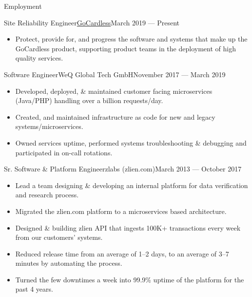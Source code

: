 \documentclass[]{mosabcv}
\begin{document}
\makeheader{}

\begin{cvsection}{Employment}
  \begin{cvsubsection}{Site Reliability
    Engineer}{\href{https://gocardless.com}{GoCardless}}{March 2019 ---
    Present}
    \begin{itemize}
      \item Protect, provide for, and progress the software and systems that
        make up the GoCardless product, supporting product teams in the
        deployment of high quality services.
    \end{itemize}
  \end{cvsubsection}

  \begin{cvsubsection}{Software Engineer}{WeQ Global Tech GmbH}{November 2017 ---
    March 2019}    \begin{itemize}
      \item Developed, deployed, \& maintained customer facing microservices
        (Java/PHP) handling over a billion requests/day.
      \item Created, and maintained infrastructure as code for new and legacy
        systems/microservices.
      \item Owned services uptime, performed systems troubleshooting \&
        debugging and participated in on-call rotations.
    \end{itemize}
  \end{cvsubsection}

  \begin{cvsubsection}{Sr. Software \& Platform Engineer}{zlabs
    (zlien.com)}{March 2013 --- October 2017}
    \begin{itemize}
      \item Lead a team designing \& developing an internal platform for data
        verification and research process.
      \item Migrated the zlien.com platform to a microservices based
        architecture.
      \item Designed \& building zlien API that ingests 100K+ transactions
        every week from our customers' systems.
      \item Reduced release time from an average of 1--2 days, to an average of
        3--7 minutes by automating the process.
      \item Turned the few downtimes a week into 99.9\% uptime of the platform
        for the past 4 years.
    \end{itemize}
  \end{cvsubsection}


\end{cvsection}
\end{document}
